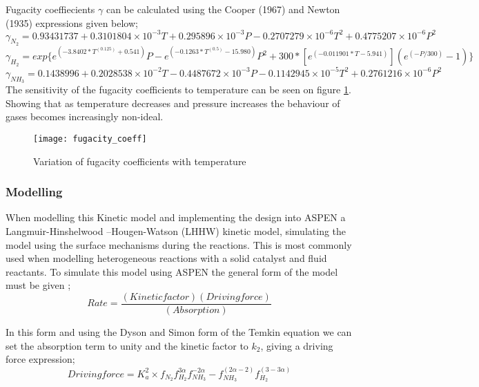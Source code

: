 {Fugacity coeffiecients $\gamma$ can be calculated using the Cooper (1967) and Newton (1935) expressions given below;
\begin{equation} 
\gamma_{N_2} = 0.93431737 + 0.3101804\times10^{-3}T+0.295896\times10^{-3}P-0.2707279\times10^{-6}T^2+0.4775207\times10^{-6}  P^2
\end{equation}
\begin{equation} 
\gamma_{H_2} = exp\{ e^{(-3.8402*T^(0.125)+0.541)}P-e^{(-0.1263*T^(0.5)-15.980)}P^2+300*[e^{(-0.011901*T-5.941)}](e^{(-P/300)}-1)\}
\end{equation}
\begin{equation} 
\gamma_{NH_3} =0.1438996 + 0.2028538\times10^{-2}T - 0.4487672\times10^{-3}P - 0.1142945\times10^{-5}T^2 + 0.2761216\times10^{-6}P^2
\end{equation}
The sensitivity of the fugacity coefficients to temperature can be seen on figure \ref{fugco}. Showing that as temperature decreases and pressure increases the behaviour of gases becomes increasingly non-ideal. 
{\centering
	\begin{figure}[h]

		\caption{Variation of fugacity coefficients with temperature}
		\label{fugco}
			
			\texttt{[image: fugacity\_coeff]}
		
\end{figure}}

\subsubsection{Modelling}
When modelling this Kinetic model and implementing the design into ASPEN a Langmuir-Hinshelwood –Hougen-Watson (LHHW) kinetic model, simulating the model using the surface mechanisms during the reactions. This is most commonly used when modelling heterogeneous reactions with a solid catalyst and fluid reactants. To simulate this model using ASPEN the general form of the model must be given \cite{Plus2008};
\begin{equation} 
Rate = \frac{(Kinetic factor)(Driving force)}{(Absorption)}
\end{equation}


In this form and using the Dyson and Simon form of the Temkin equation we can set the absorption term to unity and the kinetic factor to $k_{2}$, giving a driving force expression; 
\begin{equation} Driving force = K_a^2 \times f_{N_2}
f_{H_2}^{3\alpha}f_{NH_3}^{-2\alpha} - f_{NH_3}^{(2\alpha-2)}f_{H_2}^{(3-3\alpha)} \end{equation}

}

